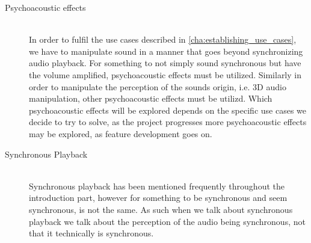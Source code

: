 \begin{description}
    \item [Psychoacoustic effects] \hfill \\
        In order to fulfil the use cases described in \cref{cha:establishing_use_cases}, we have to manipulate sound in a manner that goes beyond synchronizing audio playback.
        For something to not simply sound synchronous but have the volume amplified, psychoacoustic effects must be utilized.
        Similarly in order to manipulate the perception of the sounds origin, i.e. 3D audio manipulation, other psychoacoustic effects must be utilizd.
        Which psychoacoustic effects will be explored depends on the specific use cases we decide to try to solve, as the project progresses more psychoacoustic effects may be explored, as feature development goes on. 
    \item [Synchronous Playback] \hfill \\
        Synchronous playback has been mentioned frequently throughout the introduction part, however for something to be synchronous and seem synchronous, is not the same.
        As such when we talk about synchronous playback we talk about the perception of the audio being synchronous, not that it technically is synchronous.
\end{description}
